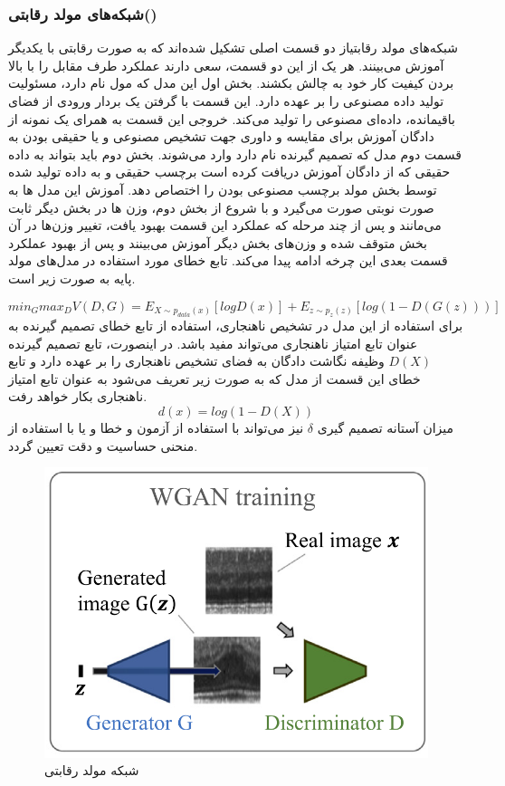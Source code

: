 \documentclass[12pt,a4paper]{report}
\theoremstyle{definition}
\theoremstyle{definition}
\begin{document}
\subsubsection{شبکه‌های مولد رقابتی()}
شبکه‌های مولد رقابتیاز دو قسمت اصلی تشکیل شده‌اند که به صورت رقابتی با یکدیگر آموزش می‌بینند. هر یک از این دو قسمت، سعی دارند عملکرد طرف مقابل را با بالا بردن کیفیت کار خود به چالش بکشند. بخش اول این مدل که مول نام دارد، مسئولیت تولید داده مصنوعی را بر عهده دارد. این قسمت با گرفتن یک بردار ورودی از فضای باقیمانده، داده‌ای مصنوعی را تولید می‌کند. خروجی این قسمت به همرای یک نمونه از دادگان آموزش برای مقایسه و داوری جهت تشخیص مصنوعی و یا حقیقی بودن به قسمت دوم مدل که تصمیم گیرنده نام دارد وارد می‌شوند. بخش دوم باید بتواند به داده حقیقی که از دادگان آموزش دریافت کرده است برچسب حقیقی و به داده تولید شده توسط بخش مولد برچسب مصنوعی بودن را اختصاص دهد. آموزش این مدل ها به صورت نوبتی صورت می‌گیرد و با شروع از بخش دوم، وزن ها در بخش دیگر ثابت می‌مانند و پس از چند مرحله که عملکرد این قسمت بهبود یافت، تغییر وزن‌ها در آن بخش متوقف شده و وزن‌های بخش دیگر آموزش می‌بینند و پس از بهبود عملکرد قسمت بعدی این چرخه ادامه پیدا می‌کند. تابع خطای مورد استفاده در مدل‌های مولد پایه به صورت زیر است.

\begin{equation}
	min_G max_D V(D, G) = E_{X \sim p_{data}(x)}[logD(x)] + E_{z \sim p_z(z)}[log(1-D(G(z)))]
\end{equation}
برای استفاده از این مدل در تشخیص ناهنجاری‌، استفاده از تابع خطای تصمیم گیرنده به عنوان تابع امتیاز ناهنجاری می‌تواند مفید باشد. در اینصورت، تابع تصمیم گیرنده $D(X)$ وظیفه نگاشت دادگان به فضای تشخیص ناهنجاری را بر عهده دارد و تابع خطای این قسمت از مدل که به صورت زیر تعریف می‌شود به عنوان تابع امتیاز ناهنجاری بکار خواهد رفت.
\begin{equation}
d(x) = log(1- D(X))
\end{equation}
 میزان آستانه تصمیم گیری $\delta$ نیز می‌تواند با استفاده از آزمون و خطا و یا با استفاده از منحنی حساسیت و دقت تعیین گردد.\\


\begin{figure}[!h]
	\begin{center}
		\includegraphics[width=0.7\linewidth]{./images/figures/gan.png}
	\end{center}
	\caption{شبکه مولد رقابتی}
	\label{fig:vae}
	\centering
\end{figure}
\end{document}
